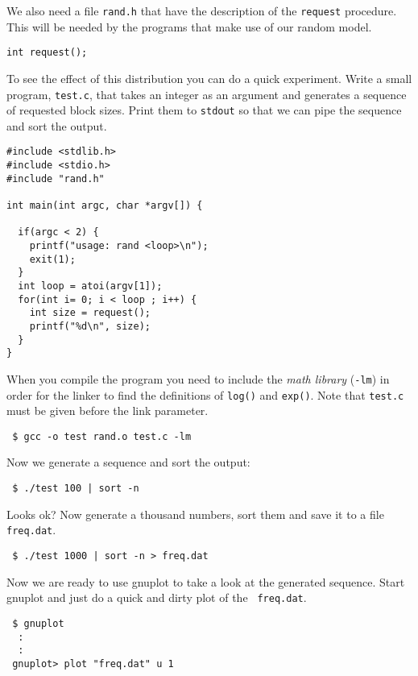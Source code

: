 \documentclass[a4paper,11pt]{article}
\begin{document}
We also need a file {\tt rand.h} that have the description of the {\tt request}
procedure. This will be needed by the programs that make use of our random model.

\begin{lstlisting}
int request();
\end{lstlisting}


To see the effect of this distribution you can do a quick
experiment. Write a small program, {\tt test.c}, that takes an integer
as an argument and generates a sequence of requested block
sizes. Print them to {\tt stdout} so that we can pipe the sequence and
sort the output.
\begin{lstlisting}
#include <stdlib.h>
#include <stdio.h>
#include "rand.h"

int main(int argc, char *argv[]) {

  if(argc < 2) {
    printf("usage: rand <loop>\n");
    exit(1);
  }
  int loop = atoi(argv[1]);
  for(int i= 0; i < loop ; i++) {
    int size = request();
    printf("%d\n", size);
  }
}				  
\end{lstlisting}


When you compile the program you need to include the {\em math
  library} ({\tt -lm}) in order for the linker to find the definitions
of {\tt log()} and {\tt exp()}. Note that {\tt test.c} must be given
before the link parameter.

\begin{verbatim}
 $ gcc -o test rand.o test.c -lm
\end{verbatim}

Now we generate a sequence and sort the output:

\begin{verbatim}
 $ ./test 100 | sort -n
\end{verbatim}

Looks ok? Now generate a thousand numbers, sort them and save it to a
file {\tt freq.dat}.

\begin{verbatim}
 $ ./test 1000 | sort -n > freq.dat
\end{verbatim}

Now we are ready to use gnuplot to take a look at the generated
sequence. Start gnuplot and just do a quick and dirty plot of the {\tt
  freq.dat}.

\begin{verbatim}
 $ gnuplot
  :
  :
 gnuplot> plot "freq.dat" u 1
\end{verbatim}
\end{document}
